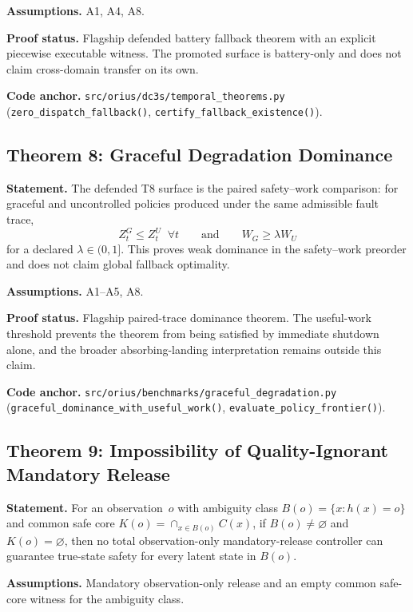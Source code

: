 \textbf{Assumptions.} A1, A4, A8.

\textbf{Proof status.} Flagship defended battery fallback theorem with an
explicit piecewise executable witness.  The promoted surface is battery-only
and does not claim cross-domain transfer on its own.

\textbf{Code anchor.} \texttt{src/orius/dc3s/temporal\_theorems.py}
(\texttt{zero\_dispatch\_fallback()}, \texttt{certify\_fallback\_existence()}).

\subsection{Theorem 8: Graceful Degradation Dominance}
\label{sec:thm-graceful-dominance}

\textbf{Statement.} The defended T8 surface is the paired safety--work
comparison: for graceful and uncontrolled policies produced under the same
admissible fault trace,
\[
  Z_t^G \le Z_t^U \;\; \forall t
  \qquad\text{and}\qquad
  W_G\ge\lambda W_U
\]
for a declared \(\lambda\in(0,1]\).  This proves weak dominance in the
safety--work preorder and does not claim global fallback optimality.

\textbf{Assumptions.} A1--A5, A8.

\textbf{Proof status.} Flagship paired-trace dominance theorem.  The useful-work
threshold prevents the theorem from being satisfied by immediate shutdown alone,
and the broader absorbing-landing interpretation remains outside this claim.

\textbf{Code anchor.} \texttt{src/orius/benchmarks/graceful\_degradation.py}
(\texttt{graceful\_dominance\_with\_useful\_work()},
\texttt{evaluate\_policy\_frontier()}).

\subsection{Theorem 9: Impossibility of Quality-Ignorant Mandatory Release}
\label{sec:thm-universal-impossibility}

\textbf{Statement.} For an observation~$o$ with ambiguity class
$B(o)=\{x:h(x)=o\}$ and common safe core
$K(o)=\cap_{x\in B(o)}C(x)$, if $B(o)\ne\varnothing$ and
$K(o)=\varnothing$, then no total observation-only mandatory-release controller
can guarantee true-state safety for every latent state in $B(o)$.

\textbf{Assumptions.} Mandatory observation-only release and an empty common
safe-core witness for the ambiguity class.

